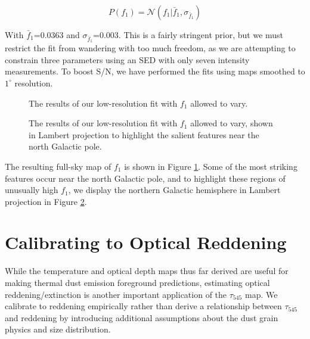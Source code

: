 \documentclass{emulateapj}
\begin{document}
\begin{equation} \label{equ:f1prior}
P(f_1) = \mathcal{N}(f_1|\bar{f}_1, \sigma_{\bar{f}_1})
\end{equation}

With $\bar{f}_1$=0.0363 and $\sigma_{\bar{f}_1}$=0.003. This is a fairly
stringent prior, but we must restrict the fit from wandering with too much
freedom, as we are attempting to constrain three parameters using an SED
with only seven intensity measurements. To boost S/N, we have performed
the fits using maps smoothed to $1^{\circ}$ resolution.

\begin{figure}
\begin{center}
\caption{\label{fig:f1} The results of our low-resolution fit with $f_1$
allowed to vary.}
\end{center}
\end{figure}

\begin{figure}
\begin{center}
\caption{\label{fig:f1lambert} The results of our low-resolution fit with $f_1$
allowed to vary, shown in Lambert projection to highlight the salient features 
near the north Galactic pole.}
\end{center}
\end{figure}

The resulting full-sky map of $f_1$ is shown in Figure \ref{fig:f1}. Some of 
the most striking features occur near the north Galactic pole, and to 
highlight these regions of unusually high $f_1$, we display the northern
Galactic hemisphere in Lambert projection in Figure \ref{fig:f1lambert}.
 

\section{Calibrating to Optical Reddening}
\label{sec:ebv}

While the temperature and optical depth maps thus far derived are
useful for making thermal dust emission foreground predictions, estimating 
optical reddening/extinction is another important application of the 
$\tau_{545}$ map. We calibrate to reddening empirically rather than derive
a relationship between $\tau_{545}$ and reddening by introducing additional 
assumptions about the dust grain physics and size distribution.
\end{document}
